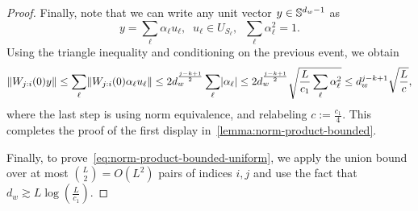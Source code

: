 \begin{proof}
	Finally, note that we can write any unit vector $y \in \mathbb{S}^{d_w - 1}$ as
	\[
		y = \sum_{\ell} \alpha_{\ell} u_{\ell}, \;\; u_{\ell} \in U_{S_{\ell}}, \;\;
		\sum_{\ell} \alpha_{\ell}^2 = 1.
	\]
	Using the triangle inequality and conditioning on the previous event, we obtain
	\begin{equation}
		\lVert W_{j:i}(0)y\rVert \leq \sum_{\ell} \lVert W_{j:i}(0)\alpha_{\ell} u_{\ell}\rVert \leq 2  d_w^{\frac{j-k+1}{2}}\sum_{\ell} \lvert\alpha_{\ell}\rvert \leq 2  d_w^{\frac{j-k+1}{2}} \sqrt{\frac{L}{c_1}\sum_{\ell} \alpha_{\ell}^2} \leq d_w^{j-k+1} \sqrt{\frac{L}{c}},
	\end{equation}
	where the last step is using norm equivalence,
	and relabeling $c := \frac{c_1}{4}$. This
	completes the proof of the first display in~\cref{lemma:norm-product-bounded}.

	Finally, to prove~\cref{eq:norm-product-bounded-uniform},
	we apply the union bound over at most $\binom{L}{2} = O(L^2)$
	pairs of indices $i, j$ and use the fact that $d_{w}
		\gtrsim L \log(\frac{L}{c_1})$.
\end{proof}

